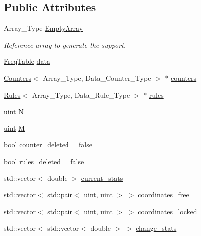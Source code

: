 \subsection*{Public Attributes}
\begin{DoxyCompactItemize}
\item 
Array\+\_\+\+Type \hyperlink{class_support_a3ec1b46e245b89ae007601caaf4958c9}{Empty\+Array}
\begin{DoxyCompactList}\small\item\em Reference array to generate the support. \end{DoxyCompactList}\item 
\hyperlink{class_freq_table}{Freq\+Table} \hyperlink{class_support_a1b7bc59cfcdd9bbdc164c6265917b030}{data}
\item 
\hyperlink{class_counters}{Counters}$<$ Array\+\_\+\+Type, Data\+\_\+\+Counter\+\_\+\+Type $>$ $\ast$ \hyperlink{class_support_abf25e6063ecc63fbceda7d58a8610560}{counters}
\item 
\hyperlink{class_rules}{Rules}$<$ Array\+\_\+\+Type, Data\+\_\+\+Rule\+\_\+\+Type $>$ $\ast$ \hyperlink{class_support_a6fc8b2206c3755acbd26d9439e100f3d}{rules}
\item 
\hyperlink{typedefs_8hpp_a91ad9478d81a7aaf2593e8d9c3d06a14}{uint} \hyperlink{class_support_a6c6f707fae03f409c556b6d4668617af}{N}
\item 
\hyperlink{typedefs_8hpp_a91ad9478d81a7aaf2593e8d9c3d06a14}{uint} \hyperlink{class_support_ac0662129b0a12fe4eac69f6f2e733b05}{M}
\item 
bool \hyperlink{class_support_a518268efc16cef68aa2211089c822c03}{counter\+\_\+deleted} = false
\item 
bool \hyperlink{class_support_aab64eca42c25f48f7688eae0bbe9f1ef}{rules\+\_\+deleted} = false
\item 
std\+::vector$<$ double $>$ \hyperlink{class_support_aec5901ad006e5ebe29c7605e7bcc702c}{current\+\_\+stats}
\item 
std\+::vector$<$ std\+::pair$<$ \hyperlink{typedefs_8hpp_a91ad9478d81a7aaf2593e8d9c3d06a14}{uint}, \hyperlink{typedefs_8hpp_a91ad9478d81a7aaf2593e8d9c3d06a14}{uint} $>$ $>$ \hyperlink{class_support_a36f6685c1f22eeca1919dfbb0ff4cb54}{coordinates\+\_\+free}
\item 
std\+::vector$<$ std\+::pair$<$ \hyperlink{typedefs_8hpp_a91ad9478d81a7aaf2593e8d9c3d06a14}{uint}, \hyperlink{typedefs_8hpp_a91ad9478d81a7aaf2593e8d9c3d06a14}{uint} $>$ $>$ \hyperlink{class_support_ab740de5d3497a4bf51cddb256f85cd72}{coordinates\+\_\+locked}
\item 
std\+::vector$<$ std\+::vector$<$ double $>$ $>$ \hyperlink{class_support_a500e5cc6eae028e6323c94641a070843}{change\+\_\+stats}
\end{DoxyCompactItemize}


